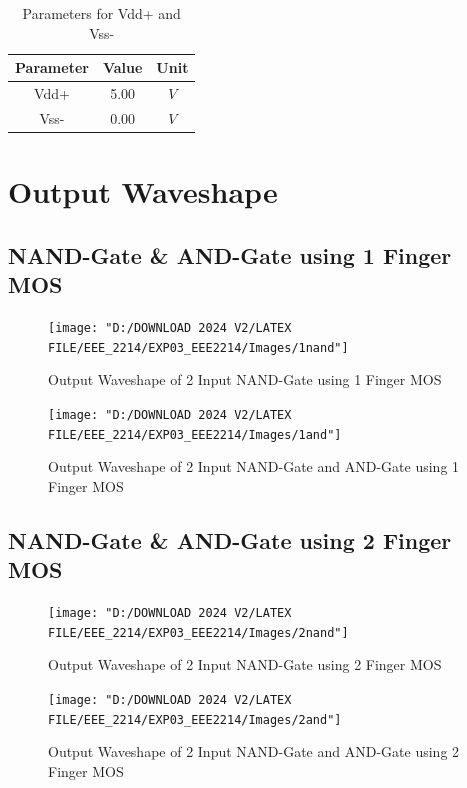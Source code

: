 \documentclass[a4paper,12pt]{article}
\begin{document}
	\begin{table}[H]
		\centering
			\caption{Parameters for Vdd+ and Vss- }
		\begin{tabular}{|c|c|c|}
			\hline
			\textbf{Parameter} & \textbf{Value} & \textbf{Unit} \\ \hline
			Vdd+               & 5.00           & $V $            \\ \hline
			Vss-               & 0.00           & $V$             \\ \hline
		\end{tabular}
		
	\end{table}

	\newpage
	\section{Output Waveshape }
	\subsection{NAND-Gate \& AND-Gate using 1 Finger MOS}
	\begin{figure}[H]
		\centering
		\texttt{[image: "D:/DOWNLOAD 2024 V2/LATEX FILE/EEE\_2214/EXP03\_EEE2214/Images/1nand"]}
		\caption{Output Waveshape of 2 Input NAND-Gate using 1 Finger MOS}
		\label{fig:1nand}
	\end{figure}
	\vspace{1.5cm}
	\begin{figure}[H]
		\centering
		\texttt{[image: "D:/DOWNLOAD 2024 V2/LATEX FILE/EEE\_2214/EXP03\_EEE2214/Images/1and"]}
		\caption{Output Waveshape of 2 Input NAND-Gate and AND-Gate using 1 Finger MOS }
		\label{fig:1and}
	\end{figure}
	
	\newpage
\subsection{NAND-Gate \& AND-Gate using 2 Finger MOS}
	
	\begin{figure}[H]
		\centering
		\texttt{[image: "D:/DOWNLOAD 2024 V2/LATEX FILE/EEE\_2214/EXP03\_EEE2214/Images/2nand"]}
		\caption{Output Waveshape of 2 Input NAND-Gate using 2 Finger MOS}
		\label{fig:2nand}
	\end{figure}
	\vspace{1.5cm}
	\begin{figure}[H]
		\centering
		\texttt{[image: "D:/DOWNLOAD 2024 V2/LATEX FILE/EEE\_2214/EXP03\_EEE2214/Images/2and"]}
		\caption{Output Waveshape of 2 Input NAND-Gate and AND-Gate using 2 Finger MOS }
		\label{fig:2and}
	\end{figure}
	\newpage
\end{document}
